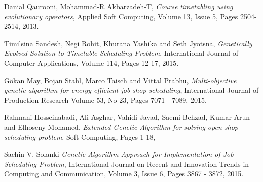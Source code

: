 \documentclass[a4paper, 12pt, titlepage]{article}
\begin{document}
\begin{thebibliography}{10}
  Danial Qaurooni, Mohammad-R Akbarzadeh-T,
  \textit{Course timetabling using evolutionary operators},
  Applied Soft Computing,
  Volume 13, 
  Issue 5,
  Pages 2504-2514,
  2013.

  Timilsina Sandesh, Negi Rohit, Khurana Yashika and Seth Jyotsna,
  \textit{Genetically Evolved Solution to Timetable Scheduling Problem},
  International Journal of Computer Applications,
  Volume 114,
  Pages 12-17,
  2015.


  Gökan May, Bojan Stahl, Marco Taisch and Vittal Prabhu,
  \textit{Multi-objective genetic algorithm for energy-efficient job shop scheduling},
  International Journal of Production Research
  Volume 53,
  No 23, 
  Pages  7071 - 7089,
  2015.

  Rahmani Hosseinabadi, Ali Asghar, Vahidi Javad, Saemi Behzad, Kumar Arun and Elhoseny Mohamed,
  \textit{Extended Genetic Algorithm for solving open-shop scheduling problem},
  Soft Computing,
  Pages 1-18, 

  Sachin V. Solanki
  \textit{Genetic Algorithm Approach for Implementation of Job Scheduling Problem},
  International Journal on Recent and Innovation Trends in Computing and Communication,
  Volume 3,
  Issue 6,
  Pages 3867 - 3872,
  2015.
  
\end{thebibliography}
\end{document}
